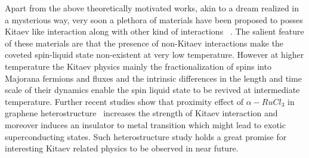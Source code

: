 \documentclass[aps,amsmath,twocolumn,amssymb,floatfix,showpacs,superscriptaddress,nofootinbib,longbibliography]{revtex4-1}
\begin{document}
Apart from the above theoretically motivated works, akin to a dream realized in a mysterious way, very soon a plethora of materials have been proposed to posses Kitaev like interaction along with other kind of interactions ~\cite{chalaupka-2010,simon-2022,takagi-2019,motome-2020,hermanns-2018,abanerjee-2016}. The salient feature of these materials are that  the presence of non-Kitaev interactions make the coveted spin-liquid state non-existent at very low temperature. However at higher temperature the Kitaev physics mainly the fractionalization of spins into Majorana fermions and fluxes and the intrinsic differences in the length and time scale of their dynamics enable the spin liquid state to be revived at intermediate temperature\cite{janssen-2017,chern-2021,czajka-2021,niravkumar-2019,wulferding-2020,berke-prb-2020,
haoxiang-nature-2021,balz-prb-2021,plessis-2020}. Further recent studies show that proximity effect of $\alpha-RuCl_3$ in graphene heterostructure~\cite{sananda-2019,sananda-2021} increases the strength of Kitaev interaction and moreover induces an insulator to metal transition which might lead to exotic superconducting states. Such heterostructure study  holds a great promise for interesting Kitaev related physics
to be observed in near future. \\
\indent
\end{document}
